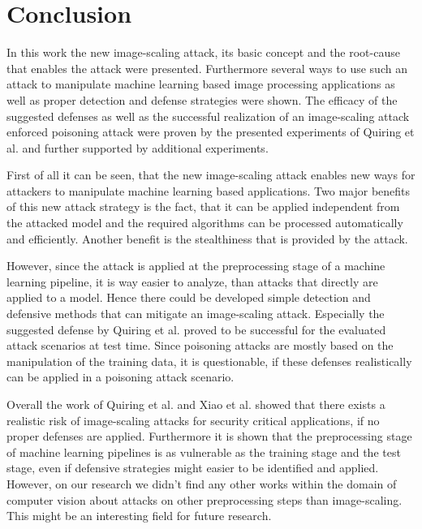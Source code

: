 \documentclass[sigconf]{acmart}
\begin{document}
\section{Conclusion}
In this work the new image-scaling attack, its basic concept and the root-cause that enables the attack were presented.
Furthermore several ways to use such an attack to manipulate machine learning based image processing applications as well as proper detection and defense strategies were shown.
The efficacy of the suggested defenses as well as the successful realization of an image-scaling attack enforced poisoning attack were proven by the presented experiments of Quiring et al. and further supported by additional experiments.

First of all it can be seen, that the new image-scaling attack enables new ways for attackers to manipulate machine learning based applications.
Two major benefits of this new attack strategy is the fact, that it can be applied independent from the attacked model and the required algorithms can be processed automatically and efficiently.
Another benefit is the stealthiness that is provided by the attack.

However, since the attack is applied at the preprocessing stage of a machine learning pipeline, it is way easier to analyze, than attacks that directly are applied to a model.
Hence there could be developed simple detection and defensive methods that can mitigate an image-scaling attack.
Especially the suggested defense by Quiring et al. proved to be successful for the evaluated attack scenarios at test time.
Since poisoning attacks are mostly based on the manipulation of the training data, it is questionable, if these defenses realistically can be applied in a poisoning attack scenario. 

Overall the work of Quiring et al. and Xiao et al. showed that there exists a realistic risk of image-scaling attacks for security critical applications, if no proper defenses are applied.
Furthermore it is shown that the preprocessing stage of machine learning pipelines is as vulnerable as the training stage and the test stage, even if defensive strategies might easier to be identified and applied.
However, on our research we didn't find any other works within the domain of computer vision about attacks on other preprocessing steps than image-scaling.
This might be an interesting field for future research.



\end{document}
